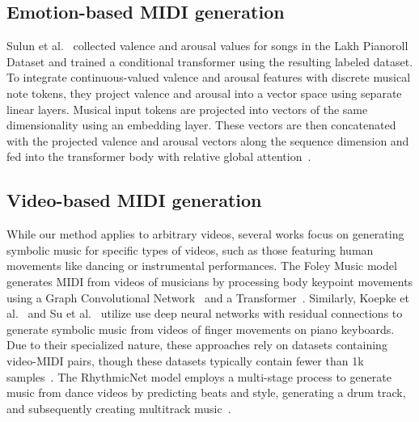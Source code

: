 \subsection{Emotion-based MIDI generation}
\label{sec:emotion_based}

Sulun et al.~ collected valence and arousal values for songs in the Lakh Pianoroll Dataset \cite{lpd} and trained a conditional transformer using the resulting labeled dataset. To integrate continuous-valued valence and arousal features with discrete musical note tokens, they project valence and arousal into a vector space using separate linear layers. 
Musical input tokens are projected into vectors of the same dimensionality using an embedding layer. These vectors are then concatenated with the projected valence and arousal vectors along the sequence dimension and fed into the transformer body with relative global attention~\cite{musictransformer}. 


\subsection{Video-based MIDI generation}

While our method applies to arbitrary videos, several works focus on generating symbolic music for specific types of videos, such as those featuring human movements like dancing or instrumental performances. The Foley Music model~\cite{foley} generates MIDI from videos of musicians by processing body keypoint movements using a Graph Convolutional Network~\cite{gcn} and a Transformer~\cite{transformer}. Similarly, Koepke et al.~ and Su et al.~ utilize use deep neural networks with residual connections to generate symbolic music from videos of finger movements on piano keyboards. Due to their specialized nature, these approaches rely on datasets containing video-MIDI pairs, though these datasets typically contain fewer than 1k samples~\cite{music_dataset,video_midi_dataset,sighttosound,audeo}. The RhythmicNet model employs a multi-stage process to generate music from dance videos by predicting beats and style, generating a drum track, and subsequently creating multitrack music~\cite{rhythmicnet}.

